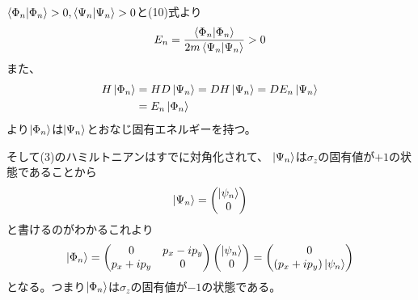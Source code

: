 \documentclass[../../sp_2015.tex]{subfiles}
\begin{document}
\subsection{}
\(\braket{\Phi_n}>0,\braket{\Psi_n}>0\)と(10)式より
\begin{equation}\begin{aligned}[b]
    E_n = \frac{\braket{\Phi_n}}{2m\braket{\Psi_n}}>0
\end{aligned}\end{equation}
また、
\begin{equation}\begin{aligned}[b]
    H\ket{\Phi_n}&=HD\ket{\Psi_n}=DH\ket{\Psi_n}=DE_n\ket{\Psi_n}\\
    &= E_n\ket{\Phi_n}
\end{aligned}\end{equation}
より\(\ket{\Phi_n}\)は\(\ket{\Psi_n}\)とおなじ固有エネルギーを持つ。

そして(3)のハミルトニアンはすでに対角化されて、
\(\ket{\Psi_n}\)は\(\sigma_z\)の固有値が\(+1\)の状態であることから
\begin{equation}\begin{aligned}[b]
    \ket{\Psi_n}=\begin{pmatrix}
        \ket{\psi_n}\\0
    \end{pmatrix}
\end{aligned}\end{equation}
と書けるのがわかるこれより
\begin{equation}\begin{aligned}[b]
    \ket{\Phi_n}=\begin{pmatrix}
        0 & p_x-ip_y\\p_x+ip_y & 0
    \end{pmatrix}\begin{pmatrix}
        \ket{\psi_n}\\0
    \end{pmatrix}
    =\begin{pmatrix}
        0\\(p_x+ip_y)\ket{\psi_n}
    \end{pmatrix}
\end{aligned}\end{equation}
となる。つまり\(\ket{\Phi_n}\)は\(\sigma_z\)の固有値が\(-1\)の状態である。
\end{document}
